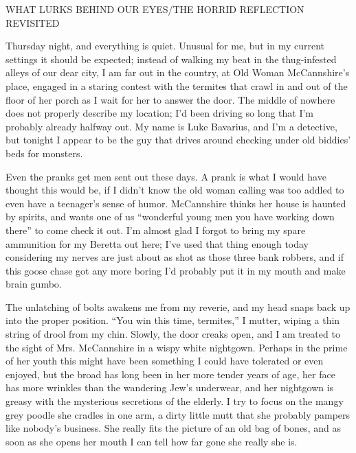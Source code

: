  





WHAT LURKS BEHIND OUR EYES/THE HORRID REFLECTION REVISITED



Thursday night, and everything is quiet. Unusual for me, but in my
current settings it should be expected; instead of walking my beat
in the thug-infested alleys of our dear city, I am far out in the
country, at Old Woman McCannshire's place, engaged in a staring
contest with the termites that crawl in and out of the floor of her
porch as I wait for her to answer the door. The middle of nowhere
does not properly describe my location; I'd been driving so long
that I'm probably already halfway out. My name is Luke Bavarius,
and I'm a detective, but tonight I appear to be the guy that drives
around checking under old biddies' beds for monsters.



Even the pranks get men sent out these days. A prank is what I
would have thought this would be, if I didn't know the old woman
calling was too addled to even have a teenager's sense of humor.
McCannshire thinks her house is haunted by spirits, and wants one
of us ``wonderful young men you have working down there'' to come
check it out. I'm almost glad I forgot to bring my spare ammunition
for my Beretta out here; I've used that thing enough today
considering my nerves are just about as shot as those three bank
robbers, and if this goose chase got any more boring I'd probably
put it in my mouth and make brain gumbo.



The unlatching of bolts awakens me from my reverie, and my head
snaps back up into the proper position. ``You win this time,
termites,'' I mutter, wiping a thin string of drool from my chin.
Slowly, the door creaks open, and I am treated to the sight of Mrs.
McCannshire in a wispy white nightgown. Perhaps in the prime of her
youth this might have been something I could have tolerated or even
enjoyed, but the broad has long been in her more tender years of
age, her face has more wrinkles than the wandering Jew's underwear,
and her nightgown is greasy with the mysterious secretions of the
elderly. I try to focus on the mangy grey poodle she cradles in one
arm, a dirty little mutt that she probably pampers like nobody's
business. She really fits the picture of an old bag of bones, and
as soon as she opens her mouth I can tell how far gone she really
she is.



